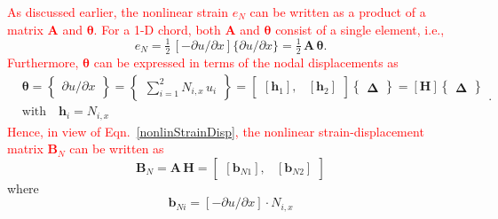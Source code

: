\textcolor{red}{As discussed earlier, the nonlinear strain $e_N$ can be written as a product of a matrix $\mathbf{A}$ and $\boldsymbol{\theta}$. For a 1-D chord, both $\mathbf{A}$ and $\boldsymbol{\theta}$ consist of a single element, i.e.,} 
\begin{equation}
e_ N =  \tfrac{1}{2} \,
[-\partial u / \partial x ]
\{\partial u / \partial x\}
= \tfrac{1}{2} \, \mathbf{A} \, \boldsymbol{\theta}.
\end{equation}
\textcolor{red}{Furthermore, $\boldsymbol{\theta}$ can be expressed in terms of the nodal displacements as}
\begin{equation}
\begin{aligned}
&\boldsymbol{\theta} =  \begin{Bmatrix}
\partial u / \partial x
\end{Bmatrix}
= \begin{Bmatrix}
\sum\nolimits_{i=1}^2 N_{i,x} \, u_i
\end{Bmatrix} 
= \begin{bmatrix}
[\mathbf{h}_1], & [\mathbf{h}_2]
\end{bmatrix}  \begin{Bmatrix} \boldsymbol{\Delta} \end{Bmatrix}  
= [\mathbf{H}] \begin{Bmatrix} \boldsymbol{\Delta} \end{Bmatrix}\\
&\text{with} \quad \mathbf{h}_i = N_{i,x}
\end{aligned}.  
\end{equation}
\textcolor{red}{Hence, in view of Eqn.~\eqref{nonlinStrainDisp}, the nonlinear strain-displacement matrix $\mathbf{B}_N$ can be written as}
\begin{equation}
\mathbf{B}_N = \mathbf{A} \, \mathbf{H}  =  \begin{bmatrix}
[\mathbf{b}_{N1}], & [\mathbf{b}_{N2}] 
\end{bmatrix} 
\end{equation}
where
\begin{equation}
\mathbf{b}_{Ni}  =   
[-\partial u / \partial x] \cdot
N_{i,x} 
\end{equation}

